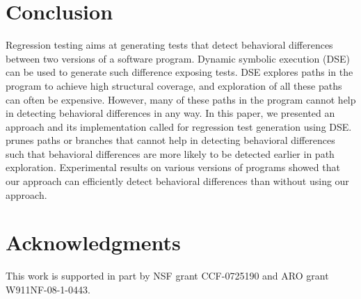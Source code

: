 \section{Conclusion}
\label{sec:conclusion}
Regression testing aims at generating tests that detect behavioral differences between two versions of a software program. Dynamic symbolic execution (DSE) can be used to generate such difference exposing tests. DSE explores paths in the program to achieve high structural coverage, and exploration of all these paths can often be expensive. However, many of these paths in the program cannot help in detecting behavioral differences in any way. In this paper, we presented an approach and its implementation called  for regression test generation using DSE.  prunes paths or branches that cannot help in detecting behavioral differences such that behavioral differences are more likely to be detected earlier in path exploration.   
Experimental results on various versions of programs showed that our approach can efficiently detect behavioral differences than without using our approach.

\section*{Acknowledgments}
This work is supported in part by NSF grant CCF-0725190 and ARO grant W911NF-08-1-0443.
